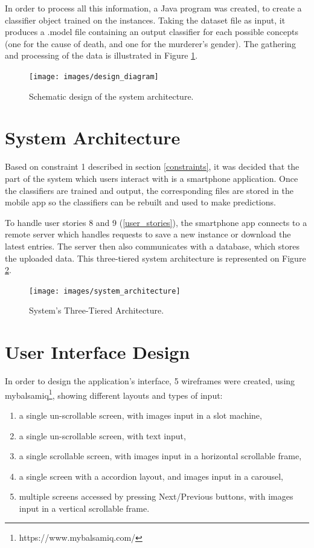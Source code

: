 \documentclass{mproj}
\begin{document}
In order to process all this information, a Java program was created, to create a classifier object trained on the instances. Taking the dataset file as input, it produces a .model file containing an output classifier for each possible concepts (one for the cause of death, and one for the murderer's gender). The gathering and processing of the data is illustrated in Figure \ref{fig:design}.

\begin{figure}[h]
	\centering
	\texttt{[image: images/design\_diagram]}
	\caption{Schematic design of the system architecture.}
	\label{fig:design}
\end{figure}

\section{System Architecture}

Based on constraint 1 described in section \ref{constraints}, it was decided that the part of the system which users interact with is a smartphone application. Once the classifiers are trained and output, the corresponding files are stored in the mobile app so the classifiers can be rebuilt and used to make predictions.\par

To handle user stories 8 and 9 (\ref{user_stories}), the smartphone app connects to a remote server which handles requests to save a new instance or download the latest entries. The server then also communicates with a database, which stores the uploaded data. This three-tiered system architecture is represented on Figure \ref{fig:architecture}.

\begin{figure}[h]
	\centering
	\texttt{[image: images/system\_architecture]}
	\caption{System's Three-Tiered Architecture.}
	\label{fig:architecture}
\end{figure}

\section{User Interface Design}\label{wireframes}

In order to design the application's interface, 5 wireframes were created, using mybalsamiq\footnote{https://www.mybalsamiq.com/}, showing different layouts and types of input:
\begin{enumerate}[label=\Alph*]
\item a single un-scrollable screen, with images input in a slot machine,
\item a single un-scrollable screen, with text input,
\item a single scrollable screen, with images input in a horizontal scrollable frame,
\item a single screen with a accordion layout, and images input in a carousel,
\item multiple screens accessed by pressing Next/Previous buttons, with images input in a vertical scrollable frame.
\end{enumerate}
\end{document}
